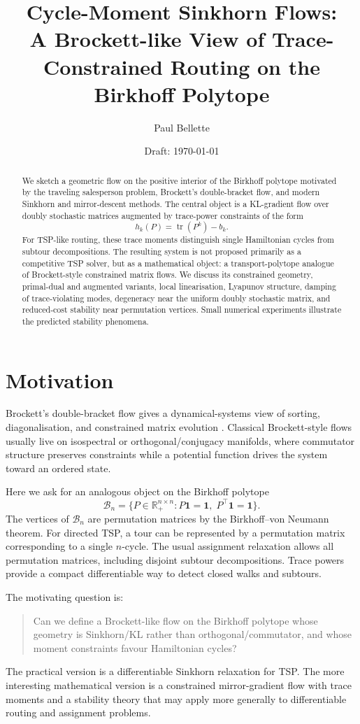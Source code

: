 \documentclass[11pt]{article}
\title{Cycle-Moment Sinkhorn Flows:\\A Brockett-like View of Trace-Constrained Routing on the Birkhoff Polytope}
\author{Paul Bellette}
\date{Draft: \today}
\newcommand{\B}{\mathcal B}
\newcommand{\one}{\mathbf 1}
\newcommand{\tr}{\operatorname{tr}}
\newcommand{\R}{\mathbb R}
\begin{document}
\maketitle

\begin{abstract}
We sketch a geometric flow on the positive interior of the Birkhoff polytope motivated by the traveling salesperson problem, Brockett's double-bracket flow, and modern Sinkhorn and mirror-descent methods. The central object is a KL-gradient flow over doubly stochastic matrices augmented by trace-power constraints of the form
\[
    h_k(P)=\tr(P^k)-b_k.
\]
For TSP-like routing, these trace moments distinguish single Hamiltonian cycles from subtour decompositions. The resulting system is not proposed primarily as a competitive TSP solver, but as a mathematical object: a transport-polytope analogue of Brockett-style constrained matrix flows. We discuss its constrained geometry, primal-dual and augmented variants, local linearisation, Lyapunov structure, damping of trace-violating modes, degeneracy near the uniform doubly stochastic matrix, and reduced-cost stability near permutation vertices. Small numerical experiments illustrate the predicted stability phenomena.
\end{abstract}

\section{Motivation}

Brockett's double-bracket flow gives a dynamical-systems view of sorting, diagonalisation, and constrained matrix evolution \citep{brockett1991dynamical}. Classical Brockett-style flows usually live on isospectral or orthogonal/conjugacy manifolds, where commutator structure preserves constraints while a potential function drives the system toward an ordered state.

Here we ask for an analogous object on the Birkhoff polytope
\[
    \B_n=\{P\in\R_+^{n\times n}:P\one=\one,\;P^\top\one=\one\}.
\]
The vertices of $\B_n$ are permutation matrices by the Birkhoff--von Neumann theorem. For directed TSP, a tour can be represented by a permutation matrix corresponding to a single $n$-cycle. The usual assignment relaxation allows all permutation matrices, including disjoint subtour decompositions. Trace powers provide a compact differentiable way to detect closed walks and subtours.

The motivating question is:
\begin{quote}
Can we define a Brockett-like flow on the Birkhoff polytope whose geometry is Sinkhorn/KL rather than orthogonal/commutator, and whose moment constraints favour Hamiltonian cycles?
\end{quote}
The practical version is a differentiable Sinkhorn relaxation for TSP. The more interesting mathematical version is a constrained mirror-gradient flow with trace moments and a stability theory that may apply more generally to differentiable routing and assignment problems.
\end{document}
